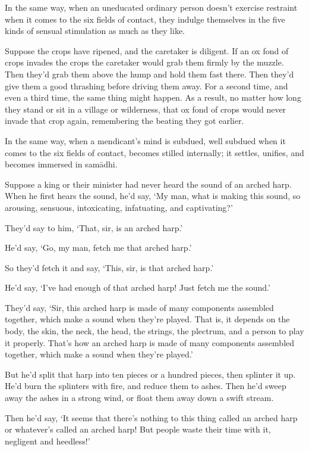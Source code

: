 \documentclass[12pt,openany]{book}%
\begin{document}
In the same way, when an uneducated ordinary person doesn’t exercise restraint when it comes to the six fields of contact, they indulge themselves in the five kinds of sensual stimulation as much as they like. 

Suppose the crops have ripened, and the caretaker is diligent. If an ox fond of crops invades the crops the caretaker would grab them firmly by the muzzle. Then they’d grab them above the hump and hold them fast there. Then they’d give them a good thrashing before driving them away. For a second time, and even a third time, the same thing might happen. As a result, no matter how long they stand or sit in a village or wilderness, that ox fond of crops would never invade that crop again, remembering the beating they got earlier. 

In the same way, when a mendicant’s mind is subdued, well subdued when it comes to the six fields of contact, becomes stilled internally; it settles, unifies, and becomes immersed in \textsanskrit{samādhi}. 

Suppose a king or their minister had never heard the sound of an arched harp. When he first hears the sound, he’d say, ‘My man, what is making this sound, so arousing, sensuous, intoxicating, infatuating, and captivating?’ 

They’d say to him, ‘That, sir, is an arched harp.’ 

He’d say, ‘Go, my man, fetch me that arched harp.’ 

So they’d fetch it and say, ‘This, sir, is that arched harp.’ 

He’d say, ‘I’ve had enough of that arched harp! Just fetch me the sound.’ 

They’d say, ‘Sir, this arched harp is made of many components assembled together, which make a sound when they’re played. That is, it depends on the body, the skin, the neck, the head, the strings, the plectrum, and a person to play it properly. That’s how an arched harp is made of many components assembled together, which make a sound when they’re played.’ 

But he’d split that harp into ten pieces or a hundred pieces, then splinter it up. He’d burn the splinters with fire, and reduce them to ashes. Then he’d sweep away the ashes in a strong wind, or float them away down a swift stream. 

Then he’d say, ‘It seems that there’s nothing to this thing called an arched harp or whatever’s called an arched harp! But people waste their time with it, negligent and heedless!’ 
\end{document}
